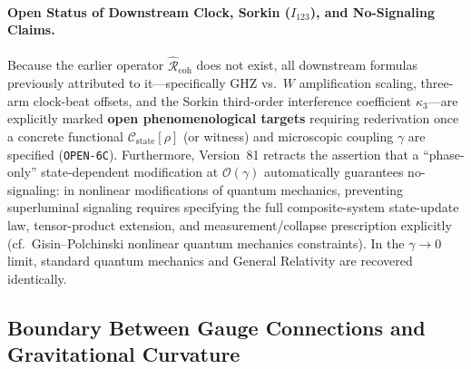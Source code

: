 \paragraph{Open Status of Downstream Clock, Sorkin ($I_{123}$), and No-Signaling Claims.}
Because the earlier operator $\hat{\mathcal{R}}_{\mathrm{coh}}$ does not exist, all downstream formulas previously attributed to it---specifically GHZ vs.\ $W$ amplification scaling, three-arm clock-beat offsets, and the Sorkin third-order interference coefficient $\kappa_3$---are explicitly marked \textbf{open phenomenological targets} requiring rederivation once a concrete functional $\mathcal{C}_{\mathrm{state}}[\rho]$ (or witness) and microscopic coupling $\gamma$ are specified (\texttt{OPEN-6C}). Furthermore, Version~81 retracts the assertion that a ``phase-only'' state-dependent modification at $\mathcal{O}(\gamma)$ automatically guarantees no-signaling: in nonlinear modifications of quantum mechanics, preventing superluminal signaling requires specifying the full composite-system state-update law, tensor-product extension, and measurement/collapse prescription explicitly (cf.\ Gisin--Polchinski nonlinear quantum mechanics constraints). In the $\gamma \to 0$ limit, standard quantum mechanics and General Relativity are recovered identically.

\bigskip

\subsection{Boundary Between Gauge Connections and Gravitational Curvature}
\label{sec:dual_geometry}


